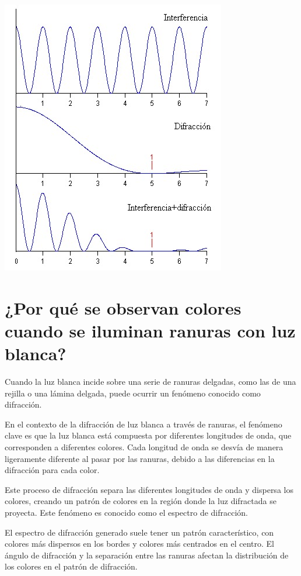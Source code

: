 \documentclass[a4paper,12pt]{article}
\newenvironment{Figure}
  {\par\medskip\noindent\minipage{\linewidth}}
  {\endminipage\par\medskip}
\begin{document}
    \begin{Figure}
        \centering
        \includegraphics[width=0.5\linewidth]{patronInterferenciaDifraccion.jpg}
        \label{fig: patronInterferenciaDifraccion}
    \end{Figure}

\section*{¿Por qué se observan colores cuando se iluminan ranuras con luz blanca?}

    Cuando la luz blanca incide sobre una serie de ranuras delgadas, como las de una rejilla o una lámina delgada, puede ocurrir un fenómeno conocido como difracción.

    En el contexto de la difracción de luz blanca a través de ranuras, el fenómeno clave es que la luz blanca está compuesta por diferentes longitudes de onda, que corresponden a diferentes colores. Cada longitud de onda se desvía de manera ligeramente diferente al pasar por las ranuras, debido a las diferencias en la difracción para cada color.

    Este proceso de difracción separa las diferentes longitudes de onda y dispersa los colores, creando un patrón de colores en la región donde la luz difractada se proyecta. Este fenómeno es conocido como el espectro de difracción.

    El espectro de difracción generado suele tener un patrón característico, con colores más dispersos en los bordes y colores más centrados en el centro. El ángulo de difracción y la separación entre las ranuras afectan la distribución de los colores en el patrón de difracción.
\end{document}
